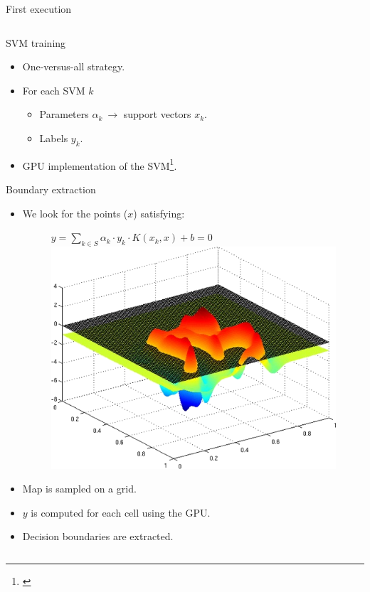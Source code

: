 \begin{frame}{First execution}
\begin{columns}
\begin{overlayarea}{\textwidth}{\textheight}
{\begin{figure}
	\end{figure}
      }
       {
	\begin{block}{SVM training}
	  \begin{itemize}
	    \item One-versus-all strategy.
	    \item For each SVM $k$
	    \begin{itemize}
	      \item Parameters $\alpha_k ~ \rightarrow$  support vectors $x_k$.
	      \item Labels $y_k$.
	    \end{itemize}
	    \item GPU implementation of the SVM\footnote{\cite{athanasopoulos2011gpu}}.
	  \end{itemize}
	\end{block}
      }
     {
	\begin{block}{Boundary extraction}
	\footnotesize
	  \begin{itemize}
	    \item We look for the points ($x$) satisfying:
	    \begin{figure}
	      $y = \sum \limits_{k \in S} \alpha_k \cdot y_k \cdot  K(x_k, x) + b = 0$
	      \includegraphics[height=0.4\textheight]{figure2}
	    \end{figure}
	    \item Map is sampled on a grid.
	    \item $y$ is computed for each cell using the GPU.
	    \item Decision boundaries are extracted.

\end{itemize}
\end{block}}
\end{overlayarea}
\end{columns}
\end{frame}
